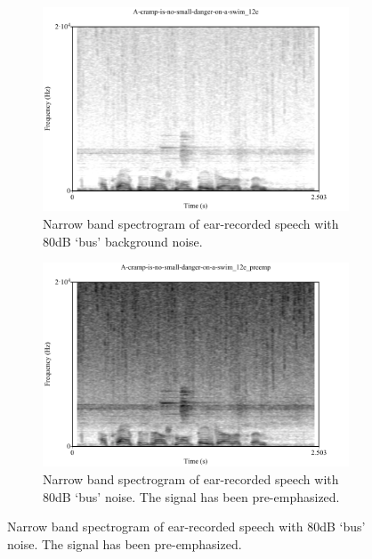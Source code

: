 \DIFdelend \DIFaddbegin \begin{figure}[h!]
\DIFaddendFL \centering
\begin{subfigure}{0.475\textwidth}
  \centering
  \includegraphics[width=1\linewidth]{figure/spctgrmEarNarrow20kHz.pdf}
  \caption{Narrow band spectrogram of ear-recorded speech with 80dB `bus' background noise.}
  \label{spctgrmEarNarrow20kHz}
\end{subfigure}%
\hfill
\begin{subfigure}{0.475\textwidth}
  \centering
  \includegraphics[width=1\linewidth]{figure/spctgrmNarrowEarNoisePremp.pdf}
  \caption{Narrow band spectrogram of ear-recorded speech with 80dB `bus' noise.  The signal has been pre-emphasized.}
  \label{spctgrmNarrowEarNoisePremp_35}
\end{subfigure}

\end{figure}
